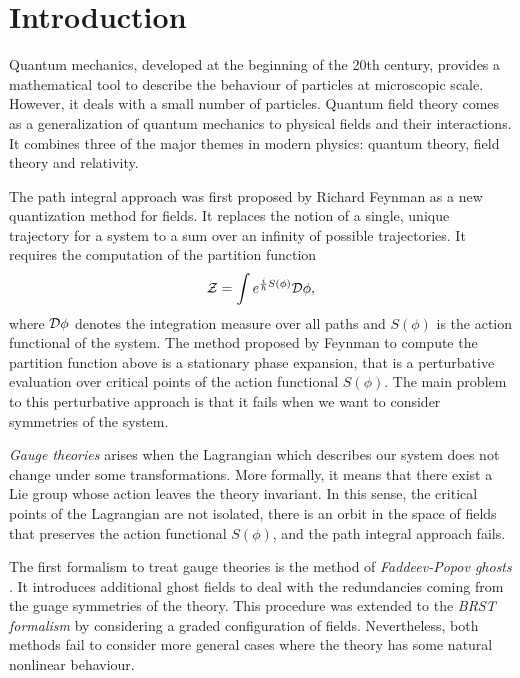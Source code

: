 \chapter*{Introduction}
\label{chap:intro}



Quantum mechanics, developed at the beginning of the 20th century, provides a mathematical tool to describe the behaviour of particles at microscopic scale.
However, it deals with a small number of particles.
Quantum field theory \cite{Intro_QFT} comes as a generalization of quantum mechanics to physical fields and their interactions.
It combines three of the major themes in modern physics: quantum theory, field theory and relativity.

The path integral approach was first proposed by Richard Feynman \cite{Feynman} as a new quantization method for fields.
It replaces the notion of a single, unique trajectory for a system to a sum over an infinity of possible trajectories.
It requires the computation of the partition function
\begin{equation*}
    \mathcal{Z} = \int e^{\frac{i}{\hbar}S(\phi)} \mathcal{D}\phi ,
\end{equation*}
where $\mathcal{D} \phi$ denotes the integration measure over all paths and $S(\phi)$ is the action functional of the system.
The method proposed by Feynman to compute the partition function above is a stationary phase expansion, that is a perturbative evaluation over critical points of the action functional $S(\phi)$.
The main problem to this perturbative approach is that it fails when we want to consider symmetries of the system.

\emph{Gauge theories} arises when the Lagrangian which describes our system does not change under some transformations.
More formally, it means that there exist a Lie group whose action leaves the theory invariant.
In this sense, the critical points of the Lagrangian are not isolated, there is an orbit in the space of fields that preserves the action functional $S(\phi)$, and the path integral approach fails.

The first formalism to treat gauge theories is the method of \emph{Faddeev-Popov ghosts} \cite{Popov}.
It introduces additional ghost fields to deal with the redundancies coming from the guage symmetries of the theory.
This procedure was extended to the \emph{BRST formalism} \cite{BRST_1, BRST_2} by considering a graded configuration of fields.
Nevertheless, both methods fail to consider more general cases where the theory has some natural nonlinear behaviour.


